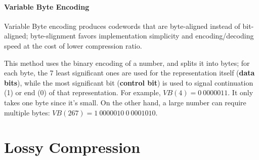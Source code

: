 \paragraph{Variable Byte Encoding}

Variable Byte encoding produces codewords that are byte-aligned instead of bit-aligned; byte-slignment favors implementation simplicity and encoding/decoding speed at the cost of lower compression ratio. 

This method uses the binary encoding of a number, and splits it into bytes; for each byte, the 7 least significant ones are used for the representation itself (\textbf{data bits}), while the most significant bit (\textbf{control bit}) is used to signal continuation (1) or end (0) of that representation. For example, $VB(4) = 0 \ 0000011$. It only takes one byte since it's small. On the other hand, a large number can require multiple bytes: $\textit{VB}(267) = 1 \ 0000010 \ 0 \ 0001010$.

\section{Lossy Compression}